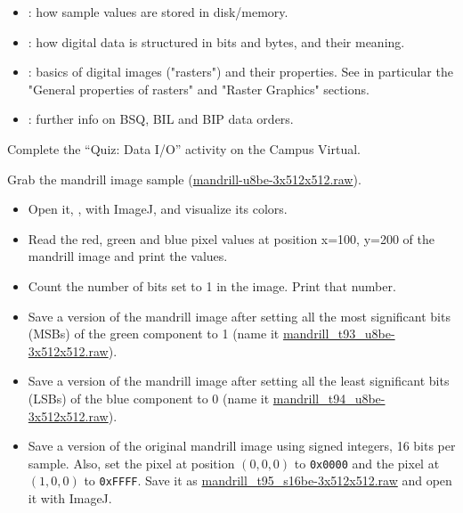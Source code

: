 \begin{itemize}
    \item \cite{chua_data_representation}: how sample values are stored in disk/memory.
    \item \cite{siegfried_bytes}: how digital data is structured in bits and bytes, and their meaning.
    \item \cite{collins_understanding_rasters}: basics of digital images ("rasters") and their properties.
        See in particular the "General properties of rasters" and "Raster Graphics" sections.
    \item \cite{loc_bsq,loc_bil,loc_bip}: further info on BSQ, BIL and BIP data orders.
\end{itemize}

\begin{exercise}
Complete the ``Quiz: Data I/O'' activity on the Campus Virtual.
\end{exercise}


\begin{exercise}
Grab the mandrill image sample (\url{mandrill-u8be-3x512x512.raw}).
\begin{itemize}
    \item Open it, \eg, with ImageJ, and visualize its colors.
    \item Read the red, green and blue pixel values at position x=100, y=200 of the mandrill image
    and print the values.
    \item Count the number of bits set to 1 in the image. Print that number.

    \item Save a version of the mandrill image after setting all the most significant bits (MSBs)
          of the green component to 1 (name it \url{mandrill_t93_u8be-3x512x512.raw}).
    \item Save a version of the mandrill image after setting all the least significant bits (LSBs)
          of the blue component to 0 (name it \url{mandrill_t94_u8be-3x512x512.raw}).
    \item Save a version of the original mandrill image using signed integers,
          16 bits per sample. Also, set the pixel at position $(0,0,0)$ to \texttt{0x0000} and
          the pixel at $(1,0,0)$ to \texttt{0xFFFF}. Save it as \url{mandrill_t95_s16be-3x512x512.raw}
          and open it with ImageJ.
\end{itemize}
\end{exercise}


%
%
%
